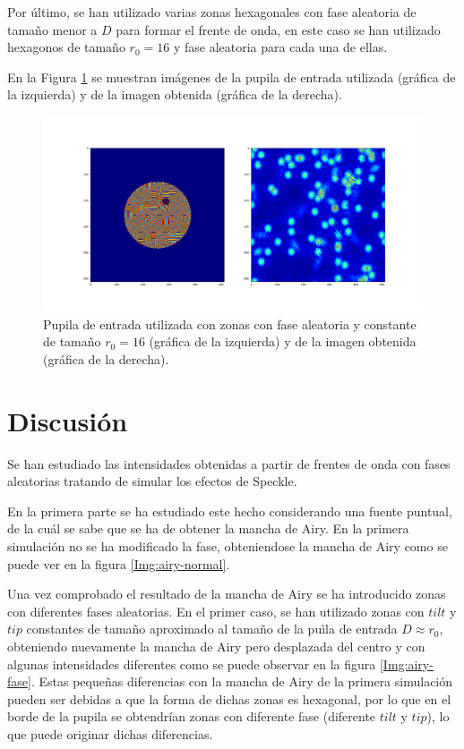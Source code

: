 \documentclass[twoside]{article}
\begin{document}
				Por último, se han utilizado varias zonas hexagonales con fase aleatoria  de tamaño menor a $D$ para formar el frente de onda, en este caso se han utilizado hexagonos de tamaño $r_0 = 16$ y fase aleatoria para cada una de ellas.

				En la Figura \ref{Img:speckle} se muestran imágenes de la pupila de entrada utilizada (gráfica de la izquierda) y de la imagen obtenida (gráfica de la derecha).

					\begin{figure}[H]
						\centering
						\includegraphics[scale=0.3]{Fig/NoAiry.png}
						\caption{\label{Img:speckle}Pupila de entrada utilizada con zonas con fase aleatoria y constante de tamaño $r_0 = 16$ (gráfica de la izquierda) y de la imagen obtenida (gráfica de la derecha).}
					\end{figure}
		
		\section{Discusión}

			Se han estudiado las intensidades obtenidas a partir de frentes de onda con fases aleatorias tratando de simular los efectos de Speckle.

			En la primera parte se ha estudiado este hecho considerando una fuente puntual, de la cuál se sabe que se ha de obtener la mancha de Airy. En la primera simulación no se ha modificado la fase, obteniendose la mancha de Airy como se puede ver en la figura \ref{Img:airy-normal}.

			Una vez comprobado el resultado de la mancha de Airy se ha introducido zonas con diferentes fases aleatorias. En el primer caso, se han utilizado zonas con $tilt$ y $tip$ constantes de tamaño aproximado al tamaño de la puìla de entrada $D \approx r_0$, obteniendo nuevamente la mancha de Airy pero desplazada del centro y con algunas intensidades diferentes como se puede observar en la figura \ref{Img:airy-fase}. Estas pequeñas diferencias con la mancha de Airy de la primera simulación pueden ser debidas a que la forma de dichas zonas es hexagonal, por lo que en el borde de la pupila se obtendrían zonas con diferente fase (diferente $tilt$ y  $tip$), lo que puede originar dichas diferencias.
\end{document}
